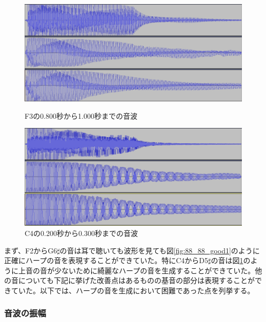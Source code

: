 \begin{figure}[t]
\begin{center}
\begin{minipage}{0.48\hsize}
\begin{center}
\includegraphics[width=0.9\hsize]{figure/88_88/f3.png}
\caption{F3の0.800秒から1.000秒までの音波}
\label{fig:88_88_good1}
\end{center}
\end{minipage}
\begin{minipage}{0.48\hsize}
\begin{center}
\includegraphics[width=0.9\hsize]{figure/88_88/c4.png}
\caption{C4の0.200秒から0.300秒までの音波}
\label{fig:88_88_good2}
\end{center}
\end{minipage}
\end{center}
\end{figure}


まず、F2からG6$\sharp$の音は耳で聴いても波形を見ても図\ref{fig:88_88_good1}のように正確にハープの音を表現することができていた。特にC4からD5$\sharp$の音は図\ref{fig:88_88_good2}のように上音の音が少ないために綺麗なハープの音を生成することができていた。他の音についても下記に挙げた改善点はあるものの基音の部分は表現することができていた。以下では、ハープの音を生成において困難であった点を列挙する。


\subsubsection{音波の振幅}

